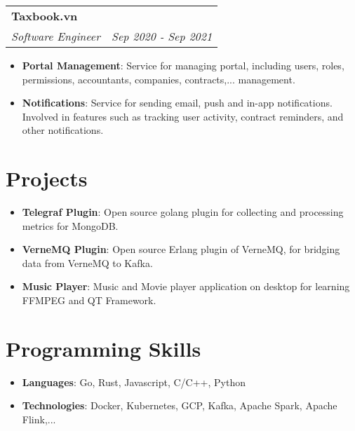 \documentclass[letterpaper,11pt]{article}
\makeatletter
\newcommand{\resumeItem}[2]{
  \item\small{
    \textbf{#1}{: #2 \vspace{-2pt}}
  }
}
\newcommand{\resumeSubheading}[4]{
  \vspace{-1pt}\item
    \begin{tabular*}{0.97\textwidth}[t]{l@{\extracolsep{\fill}}r}
      \textbf{#1} & #2 \\
      \textit{\small#3} & \textit{\small #4} \\
    \end{tabular*}\vspace{-5pt}
}
\newcommand{\resumeSubItem}[2]{\resumeItem{#1}{#2}\vspace{-4pt}}
\newcommand{\resumeSubHeadingListStart}{\begin{itemize}[leftmargin=*]}
\newcommand{\resumeSubHeadingListEnd}{\end{itemize}}
\newcommand{\resumeItemListStart}{\begin{itemize}}
\newcommand{\resumeItemListEnd}{\end{itemize}\vspace{-5pt}}
\makeatother
\begin{document}

    \resumeSubheading
    {Taxbook.vn}{}
    {Software Engineer}{Sep 2020 - Sep 2021}
    \resumeItemListStart
      \resumeItem{Portal Management}
        {Service for managing portal, including users, roles, permissions, accountants, companies, contracts,... management.}
      \resumeItem{Notifications}
        {Service for sending email, push and in-app notifications. Involved in features such as tracking user activity, contract reminders, and other notifications.}
    \resumeItemListEnd



\section{Projects}
  \resumeSubHeadingListStart
    \resumeSubItem{Telegraf Plugin}
      {Open source golang plugin for collecting and processing metrics for MongoDB.}
    \resumeSubItem{VerneMQ Plugin}
      {Open source Erlang plugin of VerneMQ, for bridging data from VerneMQ to Kafka.}
    \resumeSubItem{Music Player}
      {Music and Movie player application on desktop for learning FFMPEG and QT Framework.}
  \resumeSubHeadingListEnd

%
\section{Programming Skills}
 \resumeSubHeadingListStart
   \item{
     \textbf{Languages}{: Go, Rust, Javascript, C/C++, Python}
     \hfill
   }
   \item{
    \textbf{Technologies}{: Docker, Kubernetes, GCP, Kafka, Apache Spark, Apache Flink,...}
   }
 \resumeSubHeadingListEnd


\end{document}
